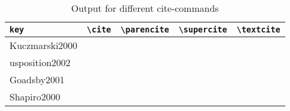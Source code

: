\documentclass[english]{ltxdockit}
\begin{document}
\begin{table}[htbp]
\begin{tabular}{llllL{4cm}}
\toprule
\texttt{key}  & \texttt{\textbackslash cite}  & \texttt{\textbackslash parencite}  & \texttt{\textbackslash supercite}  & \texttt{\textbackslash textcite}  \\
\midrule
Kuczmarski2000  & \cite{Kuczmarski2000}  & \parencite{Kuczmarski2000}  & \supercite{Kuczmarski2000}  & \textcite{Kuczmarski2000}  \\
usposition2002 & \cite{usposition2002} & \parencite{usposition2002} & \supercite{usposition2002} & \textcite{usposition2002} \\
Goadsby2001 & \cite{Goadsby2001} & \parencite{Goadsby2001} & \supercite{Goadsby2001} & \textcite{Goadsby2001} \\
Shapiro2000 & \cite{Shapiro2000} & \parencite{Shapiro2000} & \supercite{Shapiro2000} & \textcite{Shapiro2000} \\
\bottomrule
\end{tabular}
\caption{Output for different cite-commands}
\label{use:cite}
\end{table}

\printbibliography[heading=subbibnumbered, title=Result of the bibliography]
\end{document}
